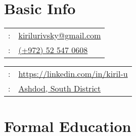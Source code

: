\setLTR
\maketitle

\section{Basic Info}
\begin{minipage}[t]{.5\linewidth}
\begin{tabular}{rp{.75\linewidth}}
\baselineskip=20pt
\email{} :   & \href{mailto:kirilurivsky@gmail.com}{kirilurivsky@gmail.com}\\
\phone{} : &\href{tel:972525470608}{(+972) 52 547 0608} \\
\end{tabular}
\end{minipage}
\begin{minipage}[t]{.5\linewidth}
\begin{tabular}{rl}
\linkedin{} : &\href{https://www.linkedin.com/in/kiril-u}{https://linkedin.com/in/kiril-u}\\
\location{} : &\href{https://goo.gl/maps/MSacjpSy7vZSKykP7}{Ashdod, South District}                                                                          
\end{tabular}
\end{minipage}





\section{Formal Education}

